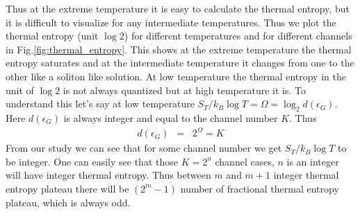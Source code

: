 \documentclass[reprint,prb,superscriptaddress]{revtex4-2}
\begin{document}
Thus at the extreme temperature it is easy to calculate the thermal entropy, but it is difficult to visualize for any intermediate temperatures. Thus we plot the thermal entropy (unit $\log 2$) for different temperatures and for different channels in Fig.\ref{fig:thermal_entropy}. This shows at the extreme temperature the thermal entropy saturates and at the intermediate temperature it changes from one to the other like a soliton like solution. At low temperature the thermal entropy in the unit of $\log 2$ is not always quantized but at high temperature it is. To understand this let's say at low temperature $S_T/k_B\log T=\Omega=\log_2 d(\epsilon_{G})$. Here $d(\epsilon_{G})$ is always integer and equal to the channel number $K$. Thus 
\begin{eqnarray}
d(\epsilon_{G}) &=& 2^{\Omega}=K
\end{eqnarray}
From our study we can see that for some channel number we get $S_T/k_B\log T$ to be integer. One can easily see that those $K=2^n$ channel cases, $n$ is an integer will have integer thermal entropy. Thus between $m$ and $m+1$ integer thermal entropy plateau there will be $(2^m-1)$ number of fractional thermal entropy plateau, which is always odd.
\end{document}
